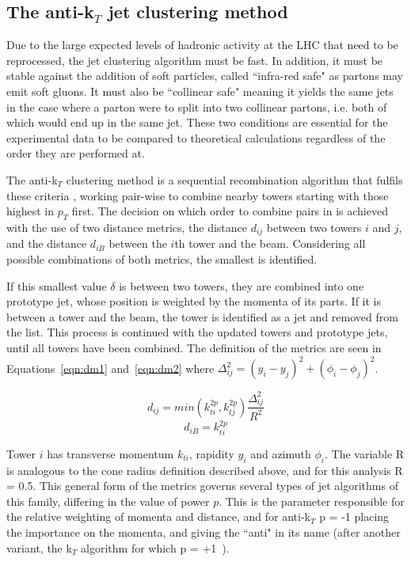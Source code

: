 \subsection{The anti-k$_{T}$ jet clustering method}

Due to the large expected levels of hadronic activity at the LHC that need to be reprocessed, the jet clustering algorithm must be fast. In addition, it must be stable against the addition of soft particles, called ``infra-red safe" as partons may emit soft gluons. It must also be ``collinear safe" meaning it yields the same jets in the case where a parton were to split into two collinear partons, i.e. both of which would end up in the same jet. These two conditions are essential for the experimental data to be compared to theoretical calculations regardless of the order they are performed at. 

The anti-k$_{T}$ clustering method \cite{akt} is a sequential recombination algorithm that fulfils these criteria \cite{aktrecom}, working pair-wise to combine nearby towers starting with those highest in $p_{T}$  first. The decision on which order to combine pairs in is achieved with the use of two distance metrics, the distance $d_{ij}$ between two towers $i$ and $j$, and the distance $d_{iB}$ between the $i$th tower and the beam. Considering all possible combinations of both metrics, the smallest is identified. 

If this smallest value $\delta$ is between two towers, they are combined into one prototype jet, whose position is weighted by the momenta of its parts. If it is between a tower and the beam, the tower is identified as a jet and removed from the list. This process is continued with the updated towers and prototype jets, until all towers have been combined. The definition of the metrics are seen in Equations~\ref{eqn:dm1} and~\ref{eqn:dm2} where $\Delta_{ij}^{2} = (y_{i}-y_{j})^{2} + (\phi_{i}-\phi_{j})^{2}$. 

 \begin{equation}
d_{ij} = min(k_{ti}^{2p},k_{tj}^{2p})\frac{\Delta_{ij}^{2}}{R^{2}}
\label{eqn:dm1}
\end{equation}
\begin{equation}
d_{iB} = k_{ti}^{2p}
\label{eqn:dm2}
\end{equation}

Tower $i$ has transverse momentum $k_{ti}$, rapidity $y_{i}$ and azimuth $\phi_{i}$. The variable R is analogous to the cone radius definition described above, and for this analysis R = 0.5. This general form of the metrics governs several types of jet algorithms of this family, differing in the value of power $p$. This is the parameter responsible for the relative weighting of momenta and distance, and for anti-k$_{T}$ p = -1 placing the importance on the momenta, and giving the ``anti" in its name (after another variant, the k$_{T}$ algorithm for which p = +1~\cite{kt}).

